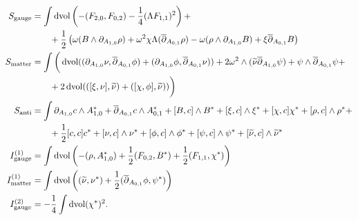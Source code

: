 \documentclass[10pt, oneside]{article}
\newcommand{\gauge}{\mathrm{gauge}}
\newcommand{\matter}{\mathrm{matter}}
\begin{document}
\begin{align*}
S_{\gauge} &= \int \dvol \left(-(F_{2, 0}, F_{0, 2}) - \frac{1}{4}(\Lambda F_{1, 1})^2\right) + \\
&\qquad + \frac 12 \left( \omega(B \wedge \dd_{A_{1,0}} \rho) + \omega^2\chi\Lambda(\ol \dd_{A_{0,1}} \rho) - \omega(\rho \wedge \dd_{A_{1,0}} B) + \xi \ol \dd_{A_{0,1}} B \right)  \\
S_{\matter} &= \int \bigg( \dvol ((\dd_{A_{1,0}}\nu, \ol \dd_{A_{0,1}} \phi) + (\dd_{A_{1,0}}\phi, \ol \dd_{A_{0,1}} \nu)) + 2\omega^2\wedge(\wt\nu \ol \dd_{A_{1,0}} \psi) + \psi \wedge \ol \dd_{A_{0,1}} \psi + \\
&\qquad + 2\dvol(([\xi,\nu],\wt\nu) + ([\chi, \phi], \wt\nu) )   \bigg) \\
S_{\mr{anti}} &= \int \dd_{A_{1, 0}} c \wedge A_{1, 0}^* + \ol\dd_{A_{0, 1}} c\wedge A_{0, 1}^* + [B, c]\wedge B^* +  [\xi, c]\wedge \xi^* + [\chi, c]\chi^* +[\rho, c]\wedge \rho^* + \\
&\qquad + \frac{1}{2}[c, c]c^* + [\nu, c]\wedge \nu^* + [\phi, c]\wedge \phi^* + [\psi, c]\wedge \psi^* + [\wt\nu, c]\wedge \wt\nu^* \\
I^{(1)}_{\gauge} &=  \int \dvol \left( - (\rho, A_{1,0}^*) + \frac 12 (F_{0,2},B^*) + \frac 12 (F_{1,1}, \chi^*)  \right)\\
I^{(1)}_{\matter} &=  \int \dvol \left( (\wt\nu, \nu^*) + \frac 12( \ol \dd_{A_{0,1}} \phi, \psi^*) \right)\\
I^{(2)}_{\gauge} &= -\frac{1}{4}\int \dvol (\chi^*)^2.
\end{align*}
\end{document}
